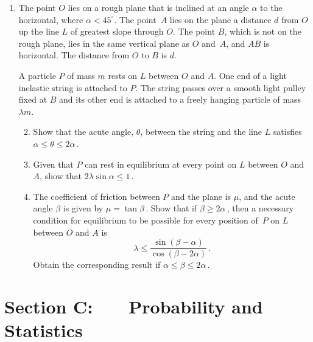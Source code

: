 \documentclass[a4, 11pt]{report}
\newlength{\qspace}
\newcounter{qnumber}
\newenvironment{question}%
 {\vspace{\qspace}
  \begin{enumerate}[\bfseries 1\quad][10]%
    \setcounter{enumi}{\value{qnumber}}%
    \item%
 }
{
  \end{enumerate}
  \filbreak
  \stepcounter{qnumber}
 }
\newenvironment{questionparts}[1][1]%
 {
  \begin{enumerate}[\bfseries (i)]%
    \setcounter{enumii}{#1}
    \addtocounter{enumii}{-1}
    \setlength{\itemsep}{5mm}
    \setlength{\parskip}{8pt}
 }
 {
  \end{enumerate}
 }
\def\le{\leqslant}
\def\ge{\geqslant}
\begin{document}

\begin {question}
The point $O$ lies on a rough plane that is inclined at an angle 
$\alpha$
 to the horizontal,
where $\alpha<45^\circ$.
 The point~$A$ lies on the plane
a distance $d$ from $O$ up the line $L$ of greatest slope through $O$.
The point $B$, which is not on the rough plane, 
 lies in the same vertical plane as $O$ and~$A$, 
and
 $AB$ is horizontal.
The distance from $O$ to $B$ is $d$.

A particle $P$ of mass $m$ rests on $L$ between $O$ and $A$. 
One end of a  light inelastic string is attached to $P$. The string
passes over a smooth light pulley fixed at $B$ 
and its other end is attached to a freely 
hanging particle of mass $\lambda m$.

\begin{questionparts}
\item
Show that  the acute angle, $\theta$, between the string and the line $L$ 
satisfies $\alpha \le \theta \le 2\alpha\,$.

\item
Given that $P$ can rest in equilibrium at 
every point on $L$ between  $O$ and $A$, 
show that $2 \lambda \sin \alpha\le   1\,$.
\item
The coefficient of friction  
between $P$ and the plane is $\mu$, and the acute angle 
$\beta$    is given by   $\mu = \tan\beta\,$.
  Show that if $\beta \ge 2 \alpha\,$,
then a necessary condition 
for equilibrium  
to be possible for every position of~$P$ on $L$ between $O$ and $A$
is
\[
\lambda \le
 \frac {\sin(\beta -\alpha)}{\cos(\beta-2\alpha)}
\,.
\]
 Obtain the corresponding result if  
 $\alpha\le  \beta\le 2\alpha\,$.


\end{questionparts}

\end{question}
\newpage
\section*{Section C: \ \ \ Probability and Statistics}
\end{document}
